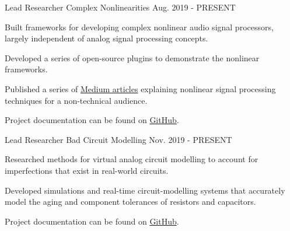 \begin{cventries}
    \cventry
    {Lead Researcher} %
    {Complex Nonlinearities} %
    {} %
    {Aug. 2019 - PRESENT} %
    {
      \begin{cvitems} %
        \item {Built frameworks for developing complex nonlinear audio signal
               processors, largely independent of analog signal processing concepts.}
        \item {Developed a series of open-source plugins to demonstrate the nonlinear frameworks.}
        \item {Published a series of \href{https://medium.com/@jatinchowdhury18/complex-nonlinearities-episode-0-why-4ad9b3eed60f}{Medium articles}
               explaining nonlinear signal processing techniques for a non-technical audience.}
        \item {Project documentation can be found on \href{https://github.com/jatinchowdhury18/ComplexNonlinearities}{GitHub}.}
      \end{cvitems}
    }

    \cventry
    {Lead Researcher} %
    {Bad Circuit Modelling} %
    {} %
    {Nov. 2019 - PRESENT} %
    {
        \begin{cvitems}
              \item{Researched methods for virtual analog circuit modelling
                    to account for imperfections that exist in real-world circuits.}
              \item{Developed simulations and real-time circuit-modelling systems that
                    accurately model the aging and component tolerances of resistors and capacitors.}
              \item{Project documentation can be found on \href{https://github.com/jatinchowdhury18/Bad-Circuit-Modelling}{GitHub}.}
        \end{cvitems}
    }


\end{cventries}
